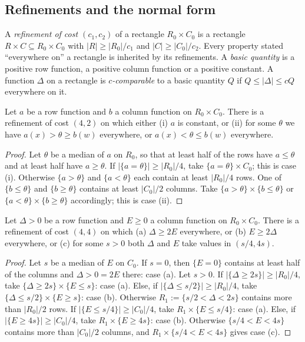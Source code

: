 \subsection{Refinements and the normal form}
A \emph{refinement of cost $(c_1,c_2)$} of a rectangle $R_0\times C_0$ is a rectangle $R\times C\subseteq R_0\times C_0$
with $|R|\ge|R_0|/c_1$ and $|C|\ge|C_0|/c_2$. Every property stated ``everywhere on'' a rectangle is inherited by
its refinements. A \emph{basic quantity} is a positive row function, a positive column function or a positive
constant. A function $\Delta$ on a rectangle is \emph{$c$-comparable} to a basic quantity $Q$ if
$Q\le|\Delta|\le cQ$ everywhere on it.

\begin{lemma}[Lemma A]\label{lem:A}
Let $a$ be a row function and $b$ a column function on $R_0\times C_0$. There is a refinement of cost $(4,2)$ on
which either (i) $a$ is constant, or (ii) for some $\theta$ we have $a(x)>\theta\ge b(w)$ everywhere, or
$a(x)<\theta\le b(w)$ everywhere.
\end{lemma}
\begin{proof}
Let $\theta$ be a median of $a$ on $R_0$, so that at least half of the rows have $a\le\theta$ and at least
half have $a\ge\theta$. If $|\{a=\theta\}|\ge|R_0|/4$, take $\{a=\theta\}\times C_0$; this is case (i).
Otherwise $\{a>\theta\}$ and $\{a<\theta\}$ each contain at least $|R_0|/4$ rows. One of $\{b\le\theta\}$ and
$\{b\ge\theta\}$ contains at least $|C_0|/2$ columns. Take $\{a>\theta\}\times\{b\le\theta\}$ or
$\{a<\theta\}\times\{b\ge\theta\}$ accordingly; this is case (ii).
\end{proof}

\begin{lemma}[Lemma B]\label{lem:B}
Let $\Delta>0$ be a row function and $E\ge0$ a column function on $R_0\times C_0$. There is a refinement of cost
$(4,4)$ on which (a) $\Delta\ge2E$ everywhere, or (b) $E\ge2\Delta$ everywhere, or (c) for some $s>0$ both
$\Delta$ and $E$ take values in $(s/4,4s)$.
\end{lemma}
\begin{proof}
Let $s$ be a median of $E$ on $C_0$. If $s=0$, then $\{E=0\}$ contains at least half of the columns and
$\Delta>0=2E$ there: case (a). Let $s>0$. If $|\{\Delta\ge2s\}|\ge|R_0|/4$, take
$\{\Delta\ge2s\}\times\{E\le s\}$: case (a). Else, if $|\{\Delta\le s/2\}|\ge|R_0|/4$, take
$\{\Delta\le s/2\}\times\{E\ge s\}$: case (b). Otherwise $R_1:=\{s/2<\Delta<2s\}$ contains more than
$|R_0|/2$ rows. If $|\{E\le s/4\}|\ge|C_0|/4$, take $R_1\times\{E\le s/4\}$: case (a). Else, if
$|\{E\ge4s\}|\ge|C_0|/4$, take $R_1\times\{E\ge4s\}$: case (b). Otherwise $\{s/4<E<4s\}$ contains more than
$|C_0|/2$ columns, and $R_1\times\{s/4<E<4s\}$ gives case (c).
\end{proof}

